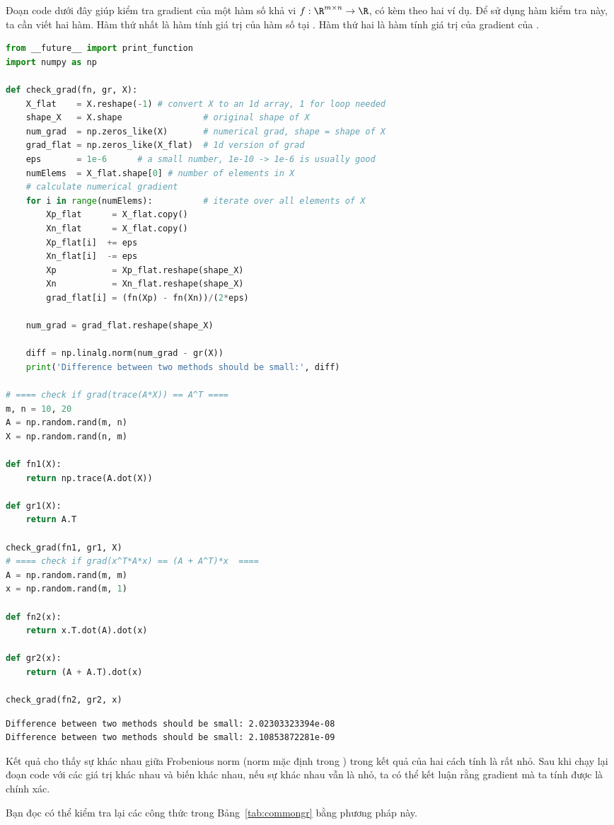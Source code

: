 Đoạn code dưới đây giúp kiểm tra gradient của một hàm số khả vi $f:
\R^{m \times n} \rightarrow \R$, có kèm theo hai ví dụ. Để sử dụng hàm kiểm tra
 này, ta cần viết hai hàm. Hàm thứ nhất là hàm
 tính giá trị của hàm số tại . Hàm thứ hai
là hàm  tính giá trị của gradient của .

\newpage

\begin{lstlisting}[language=Python]
from __future__ import print_function
import numpy as np

def check_grad(fn, gr, X):
    X_flat    = X.reshape(-1) # convert X to an 1d array, 1 for loop needed
    shape_X   = X.shape                # original shape of X
    num_grad  = np.zeros_like(X)       # numerical grad, shape = shape of X
    grad_flat = np.zeros_like(X_flat)  # 1d version of grad
    eps       = 1e-6      # a small number, 1e-10 -> 1e-6 is usually good
    numElems  = X_flat.shape[0] # number of elements in X
    # calculate numerical gradient
    for i in range(numElems):          # iterate over all elements of X
        Xp_flat      = X_flat.copy()
        Xn_flat      = X_flat.copy()
        Xp_flat[i]  += eps
        Xn_flat[i]  -= eps
        Xp           = Xp_flat.reshape(shape_X)
        Xn           = Xn_flat.reshape(shape_X)
        grad_flat[i] = (fn(Xp) - fn(Xn))/(2*eps)

    num_grad = grad_flat.reshape(shape_X)

    diff = np.linalg.norm(num_grad - gr(X))
    print('Difference between two methods should be small:', diff)

# ==== check if grad(trace(A*X)) == A^T ====
m, n = 10, 20
A = np.random.rand(m, n)
X = np.random.rand(n, m)

def fn1(X):
    return np.trace(A.dot(X))

def gr1(X):
    return A.T

check_grad(fn1, gr1, X)
# ==== check if grad(x^T*A*x) == (A + A^T)*x  ====
A = np.random.rand(m, m)
x = np.random.rand(m, 1)

def fn2(x):
    return x.T.dot(A).dot(x)

def gr2(x):
    return (A + A.T).dot(x)

check_grad(fn2, gr2, x)

\end{lstlisting}
\kq 
\begin{lstlisting}
Difference between two methods should be small: 2.02303323394e-08
Difference between two methods should be small: 2.10853872281e-09
\end{lstlisting}

Kết quả cho thấy sự khác nhau giữa Frobenious norm (norm mặc định trong
) trong kết quả của hai cách tính là rất nhỏ. Sau
khi chạy lại đoạn code với các giá trị  khác nhau và biến
 khác nhau, nếu sự khác nhau vẫn là nhỏ, ta có thể kết luận rằng
gradient mà ta tính được là chính xác.

Bạn đọc có thể kiểm tra lại các công thức trong Bảng~\ref{tab:commongr} bằng
phương pháp này.



